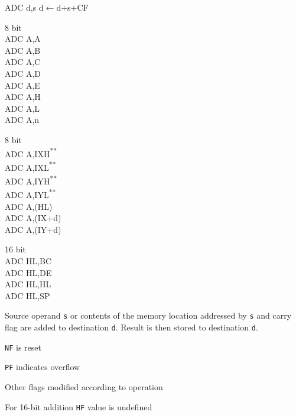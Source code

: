 \documentclass[twoside,openright,a4paper]{book}
\newcommand{\UNDOC}{\textnormal{\textsuperscript{**}}}
\begin{document}
\begin{basedescript}{
	\desclabelstyle{\multilinelabel}
	\desclabelwidth{3cm}}
	\newcommand{\DetailTime}[3]{
		{\tt #1} & #2 & #3 & 
			\nprounddigits{1}
			{\footnotesize {\tt \numprint{\fpeval{#3/3.5}}}$\mu$s} & 
			\nprounddigits{2}
			{\footnotesize {\tt \numprint{\fpeval{#3/7}}}$\mu$s} & 
			\nprounddigits{2}
			{\footnotesize {\tt \numprint{\fpeval{#3/14}}}$\mu$s} & 
			\nprounddigits{2}
			{\footnotesize {\tt \numprint{\fpeval{#3/28}}}$\mu$s} \\
	}

	\pagebreak
	\begin{detailitem}{ADC d,s}
		{d$\leftarrow$d+s+CF}

		\begin{DetailVariants}
			\textnormal{8 bit}\\
			ADC A,A\\
			ADC A,B\\
			ADC A,C\\
			ADC A,D\\
			ADC A,E\\
			ADC A,H\\
			ADC A,L\\
			ADC A,n

			\columnbreak

			\textnormal{8 bit}\\
			ADC A,IXH\UNDOC\\
			ADC A,IXL\UNDOC\\
			ADC A,IYH\UNDOC\\
			ADC A,IYL\UNDOC\\
			ADC A,(HL)\\
			ADC A,(IX+d)\\
			ADC A,(IY+d)

			\columnbreak

			\textnormal{16 bit}\\
			ADC HL,BC\\
			ADC HL,DE\\
			ADC HL,HL\\
			ADC HL,SP\\
		\end{DetailVariants}
		
		Source operand {\tt s} or contents of the memory location addressed by {\tt s} and carry flag are added to destination {\tt d}. Result is then stored to destination {\tt d}.

		\begin{DetailEffects}
			\item {\tt NF} is reset
			\item {\tt PF} indicates overflow
			\item Other flags modified according to operation
			\item For 16-bit addition {\tt HF} value is undefined
		\end{DetailEffects}


\end{detailitem}
\end{basedescript}
\end{document}
